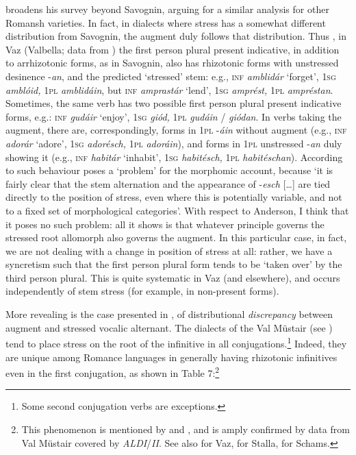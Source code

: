 \documentclass[output=paper,
modfonts
]{LSP/langsci}
\begin{document}
\citet{anderson2013stem}broadens his survey beyond Savognin, arguing for a
similar analysis for other Romansh varieties. In fact, in dialects where
stress has a somewhat different distribution from Savognin, the augment
duly follows that distribution. Thus \citet[21f.]{anderson2013stem}, in Vaz
(Valbella; data from \citealt{ebneter1981a}) the first person plural present
indicative, in addition to arrhizotonic forms, as in Savognin, also has
rhizotonic forms with unstressed desinence -\emph{an}, and the predicted
`stressed' stem: e.g., \textsc{inf} \emph{amblidár} `forget',
\textsc{1sg} \emph{amblóid,} \textsc{1pl} \emph{amblidáin}, but
\textsc{inf} \emph{amprastár} `lend', \textsc{1sg} \emph{amprést,}
\textsc{1pl} \emph{ampréstan}. Sometimes, the same verb has two possible
first person plural present indicative forms, e.g.: \textsc{inf}
\emph{gudáir} `enjoy', \textsc{1sg} \emph{giód,} \textsc{1pl}
\emph{gudáin} / \emph{giódan}. In verbs taking the augment, there are,
correspondingly, forms in \textsc{1pl} -\emph{áin} without augment
(e.g., \textsc{inf} \emph{adorár} `adore', \textsc{1sg} \emph{adorésch,}
\textsc{1pl} \emph{adoráin}), and forms in \textsc{1pl} unstressed
-\emph{an} duly showing it (e.g., \textsc{inf} \emph{habitár} `inhabit',
\textsc{1sg} \emph{habitésch,} \textsc{1pl} \emph{habitéschan}).
According to \citet[23]{anderson2013stem} such behaviour poses a `problem' for the
morphomic account, because `it is fairly clear that the stem alternation
and the appearance of -\emph{esch} {[}\ldots{}{]} are tied directly to
the position of stress, even where this is potentially variable, and not
to a fixed set of morphological categories'. With respect to Anderson, I
think that it poses no such problem: all it shows is that whatever
principle governs the stressed root allomorph also governs the augment.
In this particular case, in fact, we are not dealing with a change in
position of stress at all: rather, we have a syncretism such that the
first person plural form tends to be `taken over' by the third person
plural. This is quite systematic in Vaz (and elsewhere), and occurs
independently of stem stress (for example, in non-present forms).

More revealing is the case presented in \citet[45f.]{maiden2011a}, of
distributional \emph{discrepancy} between augment and stressed vocalic
alternant. The dialects of the Val Müstair (see \citealt[132]{schorta1938a}) tend
to place stress on the root of the infinitive in all
conjugations.\footnote{Some second conjugation verbs are exceptions.}
Indeed, they are unique among Romance languages in generally having
rhizotonic infinitives even in the first conjugation, as shown in Table
7:\footnote{This phenomenon is mentioned by \citet[35]{sturzinger1879} and
  \citet[518f.]{huonder1901}, and is amply confirmed by data from Val Müstair
  covered by \emph{ALDI}/\emph{II}. See also \citet[222]{grisch1939a} for Vaz,
  \citet[51]{candrian1900a} for Stalla, \citet[135]{soler1991a} for Schams.}
\end{document}
